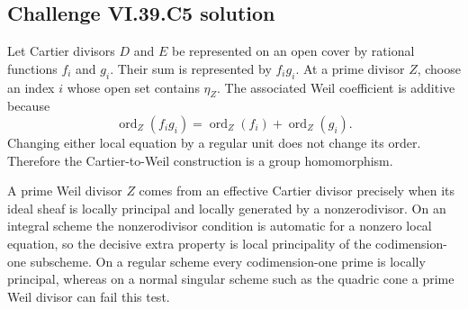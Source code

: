 \subsection*{Challenge VI.39.C5 solution}
\begin{solution}
Let Cartier divisors \(D\) and \(E\) be represented on an open cover by rational functions \(f_i\) and \(g_i\).  Their sum is represented by \(f_ig_i\).  At a prime divisor \(Z\), choose an index \(i\) whose open set contains \(\eta_Z\).  The associated Weil coefficient is additive because
\[
 \operatorname{ord}_Z(f_ig_i)
 =\operatorname{ord}_Z(f_i)+\operatorname{ord}_Z(g_i).
\]
Changing either local equation by a regular unit does not change its order.  Therefore the Cartier-to-Weil construction is a group homomorphism.

A prime Weil divisor \(Z\) comes from an effective Cartier divisor precisely when its ideal sheaf is locally principal and locally generated by a nonzerodivisor.  On an integral scheme the nonzerodivisor condition is automatic for a nonzero local equation, so the decisive extra property is local principality of the codimension-one subscheme.  On a regular scheme every codimension-one prime is locally principal, whereas on a normal singular scheme such as the quadric cone a prime Weil divisor can fail this test.
\end{solution}
